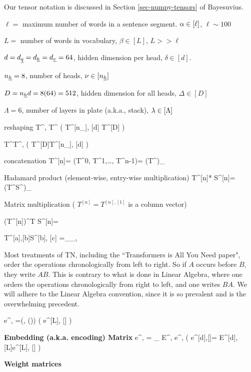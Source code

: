 Our tensor notation is discussed in Section 
\ref{sec-numpy-tensors} of Bayesuvius.


$\ell=$ maximum number of words in a sentence segment. $\alpha\in [\ell]$, $\ell\sim 100$

$L=$ number of words in vocabulary, $\beta\in[L]$, $L>> \ell$

$d=d_{\underline{q}}=d_{\underline{k}}=d_{\underline{v}}=64$, hidden dimension  per head,
$\delta\in[d]$. 

$n_{\underline{h}}=8$, number of heads, $\nu \in[n_{\underline{h}}]$

$D=n_{\underline{h}} d=8(64)=512$, hidden dimension for all heads,
$\Delta\in [D]$

$\Lambda=6$, number of layers in plate (a.k.a., stack), $\lambda\in[\Lambda]$

reshaping
\beq
T^{\nu, \delta}\rarrow T^{\Delta}
\;\;
\left(
T^{[n_\rvh], [d]} \rarrow T^{[D]}
\right)
\eeq

\beq
T^{\Delta}\rarrow T^{\nu, \delta}
\;\;
\left(
T^{[D]}\rarrow T^{[n_\rvh], [d]}
\right)
\eeq

concatenation
\beq
T^{[n]}= (T^0, T^1,\ldots, T^{n-1})= 
(T^\nu)_{\nu\in[n]}
\eeq

Hadamard product (element-wise, entry-wise multiplication)
\beq
T^{[n]}* S^{[n]}= (T^\nu S^\nu)_{\nu\in[n]}
\eeq


Matrix multiplication
( $T^{[n]}= T^{[n], [1]}$ is a column vector)

\beq
(T^{[n]})^T S^{[n]}=
\eeq

\beq
T^{[a],[b]}S^{[b], [c]}
=
_{\alp_\in [a], \gamma \in [c]}
\eeq

Most treatments of TN, including the
``Transformers is All You Need paper",  order the
operations chronologically from
left to right. So if $A$ occurs before $B$,
they write $AB$.
This is contrary 
to what is done in Linear Algebra, where one 
orders the operations chronologically from right to left, and one writes $BA$.
We will adhere to the Linear Algebra
convention, since it is so prevalent
and is the overwhelming precedent.


\beq
e^{\beta, \alp} =\delta(\beta, \beta(\alp))
\left(
e^{[L], [\ell]} 
\right)
\eeq


{\bf Embedding (a.k.a. encoding) Matrix}
\beq
e^{\delta, \alp} = \sum_\beta 
E^{\delta, \beta}
e^{\beta, \alp}
\;\;
\left(
e^{[d],[\ell]}= E^{[d], [L]}e^{[L], [\ell]}
\right)
\eeq

{\bf Weight matrices}

